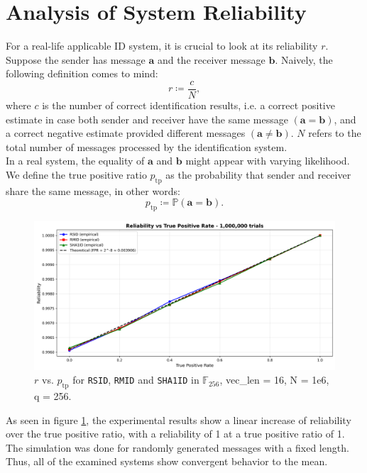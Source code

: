 \documentclass[english,BCOR=4mm,cdfont=false]{tudscrreprt} %
\begin{document}
\section{Analysis of System Reliability}
\label{sec:sysRel}
For a real-life applicable ID system, it is crucial to look at its reliability $r$. Suppose the sender has message $\mathbf{a}$ and the receiver message $\mathbf{b}$. Naively, the following definition comes to mind:
\begin{equation}
    r \coloneq \frac{c}{N},
\end{equation}
where $c$ is the number of correct identification results, i.e. a correct positive estimate in case both sender and receiver have the same message $(\mathbf{a} = \mathbf{b})$, and a correct negative estimate provided different messages $(\mathbf{a} \neq \mathbf{b})$. $N$ refers to the total number of messages processed by the identification system. \\
In a real system, the equality of $\mathbf{a}$ and $\mathbf{b}$ might appear with varying likelihood. We define the true positive ratio $p_\text{tp}$ as the probability that sender and receiver share the same message, in other words:
\begin{equation}
    p_\text{tp} \coloneq \mathbb{P}(\boldsymbol{a} = \boldsymbol{b}). 
\end{equation}

\begin{figure}[h!]
    \centering
    \includegraphics[width=0.75\linewidth]{plots/reliability_comparison.png}
    \caption{$r$ vs. $p_\text{tp}$ for \texttt{RSID}, \texttt{RMID} and \texttt{SHA1ID} in $\mathbb{F}_{256}$, vec\_len = 16, N = 1e6, q = 256.}
    \label{fig:tpRate}
\end{figure}

As seen in figure \ref{fig:tpRate}, the experimental results show a linear increase of reliability over the true positive ratio, with a reliability of 1 at a true positive ratio of 1. The simulation was done for randomly generated messages with a fixed length. Thus, all of the examined systems show convergent behavior to the mean.
\end{document}
